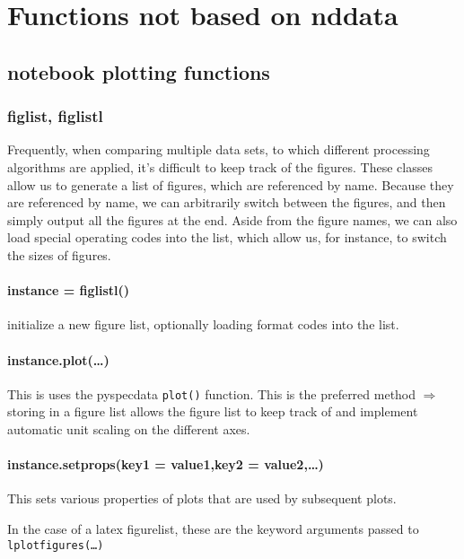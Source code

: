 \section{Functions not based on nddata}\label{sec:writeup_sofware_Pyspec_nonnddata}
\subsection{notebook plotting functions}
\subsubsection{figlist, figlistl}
Frequently, when comparing multiple data sets,
    to which different processing algorithms are applied,
    it's difficult to keep track of the figures.
These classes allow us to generate a list of figures,
    which are referenced by name.
Because they are referenced by name, we can arbitrarily
    switch between the figures,
    and then simply output all the figures at the end.
Aside from the figure names, we can also load special operating
    codes into the list, which allow us, for instance,
    to switch the sizes of figures.
    \paragraph{instance = figlistl()} initialize a new figure list,
        optionally loading format codes into the list.
    \paragraph{instance.plot(\ldots)}
    This is uses the pyspecdata \texttt{plot()} function.
    This is the preferred method $\Rightarrow$ storing in a figure list allows the figure list to keep track of and implement automatic unit scaling on the different axes.
    \paragraph{instance.setprops(key1 = value1,key2 = value2,\ldots)}
    This sets various properties of plots that are used by subsequent plots.

    In the case of a latex figurelist, these are the keyword arguments passed to
    \texttt{lplotfigures(\ldots)}
